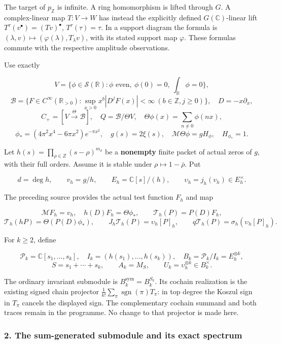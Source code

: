 The target of \(p_{\mathbb Z}\) is infinite. A ring homomorphism is
lifted through \(G\). A complex-linear map \(T:V\to W\) has instead the
explicitly defined \(G(\mathbb C)\)-linear lift
\(T^\tau(v^\bullet)=(Tv)^\bullet\), \(T^\tau(\tau)=\tau\). In a support
diagram the formula is
\((\lambda,v)\mapsto(\varphi(\lambda),T_\lambda v)\), with its stated
support map \(\varphi\). These formulas commute with the respective
amplitude observations.

Use exactly

\[V=\{\phi\in\mathcal S(\mathbb R):\phi\text{ even},\ \phi(0)=0,\ \int_{\mathbb R}\phi=0\},\]
\[\mathscr B=\{F\in C^\infty(\mathbb R_{>0}):\sup_{x>0}x^b|D^jF(x)|<\infty\ (b\in\mathbb Z,j\ge0)\},\quad D=-x\partial_x,\]
\[C_+=[V\xrightarrow{\Theta}\mathscr B],\quad Q=\mathscr B/\Theta V,\quad
\Theta\phi(x)=\sum_{n\ne0}\phi(nx),\]
\[\phi_*=(4\pi^2x^4-6\pi x^2)e^{-\pi x^2},\quad
 g(s)=2\xi(s),\quad \mathcal M\Theta\phi=gH_\phi,\quad H_{\phi_*}=1.\tag{1.2}\]

Let \(h(s)=\prod_{\rho\in Z}(s-\rho)^{m_\rho}\) be a \textbf{nonempty}
finite packet of actual zeros of \(g\), with their full orders. Assume
it is stable under \(\rho\mapsto1-\bar\rho\). Put

\[d=\deg h,\qquad v_h=g/h,\qquad E_h=\mathbb C[s]/(h),\qquad
\upsilon_h=j_h(v_h)\in E_h^\times.\tag{1.3}\]

The preceding source provides the actual test function \(F_h\) and map

\[\mathcal MF_h=v_h,\quad h(D)F_h=\Theta\phi_*,\qquad
\mathcal T_h(P)=P(D)F_h,\] \[\mathcal T_h(hP)=\Theta(P(D)\phi_*),\qquad
J_h\mathcal T_h(P)=\upsilon_h[P]_h,\qquad
q\mathcal T_h(P)=\sigma_h(\upsilon_h[P]_h).\tag{1.4}\]

For \(k\ge2\), define

\[\mathcal P_k=\mathbb C[s_1,\ldots,s_k],\quad I_k=(h(s_1),\ldots,h(s_k)),\quad
B_k=\mathcal P_k/I_k=E_h^{\otimes k},\]
\[S=s_1+\cdots+s_k,\qquad A_k=M_S,\qquad U_k=\upsilon_h^{\otimes k}\in B_k^\times.\tag{1.5}\]

The ordinary invariant submodule is \(B_k^{\mathrm{sym}}=B_k^{S_k}\).
Its cochain realization is the existing signed chain projector
\(\frac1{k!}\sum_\pi\operatorname{sgn}(\pi)T_\pi\): in top degree the
Koszul sign in \(T_\pi\) cancels the displayed sign. The complementary
cochain summand and both traces remain in the programme. No change to
that projector is made here.

\subsubsection{2. The sum-generated submodule and its exact
spectrum}\label{cyclic_sum:the-sum-generated-submodule-and-its-exact-spectrum}


